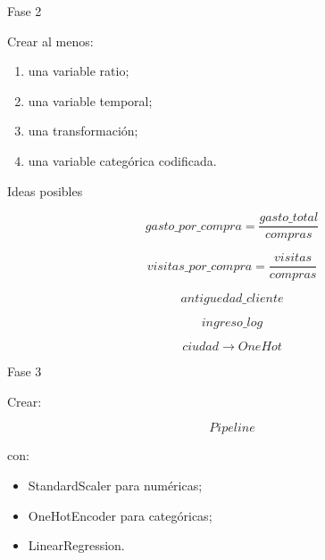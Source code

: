 \documentclass[aspectratio=169,11pt]{beamer}
\begin{document}

\begin{frame}{Fase 2}

Crear al menos:

\begin{enumerate}

    \item una variable ratio;

    \item una variable temporal;

    \item una transformación;

    \item una variable categórica codificada.

\end{enumerate}

\end{frame}


\begin{frame}{Ideas posibles}

\[
gasto\_por\_compra
=
\frac{
gasto\_total
}{
compras
}
\]

\[
visitas\_por\_compra
=
\frac{
visitas
}{
compras
}
\]

\[
antiguedad\_cliente
\]

\[
ingreso\_log
\]

\[
ciudad\rightarrow OneHot
\]

\end{frame}


\begin{frame}{Fase 3}

Crear:

\[
Pipeline
\]

con:

\begin{itemize}

    \item StandardScaler para numéricas;

    \item OneHotEncoder para categóricas;

    \item LinearRegression.

\end{itemize}

\end{frame}
\end{document}
